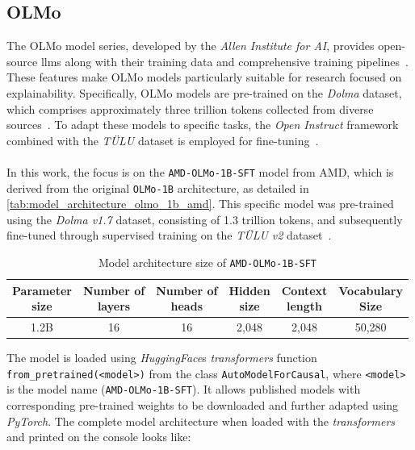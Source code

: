 \subsection{OLMo}
The OLMo model series, developed by the \emph{Allen Institute for AI}, provides open-source \acrshort{llm}s along with their training data and comprehensive training pipelines~\cite{DBLP:conf/acl/GroeneveldBWBKT24}. These features make OLMo models particularly suitable for research focused on explainability. Specifically, OLMo models are pre-trained on the \emph{Dolma} dataset, which comprises approximately three trillion tokens collected from diverse sources~\cite{DBLP:conf/acl/SoldainiKBSAABC24}. To adapt these models to specific tasks, the \emph{Open Instruct} framework combined with the \emph{TÜLU} dataset is employed for fine-tuning~\cite{DBLP:journals/corr/abs-2311-10702}.
\\\\
In this work, the focus is on the \texttt{AMD-OLMo-1B-SFT} model from AMD, which is derived from the original \texttt{OLMo-1B} architecture, as detailed in \autoref{tab:model_architecture_olmo_1b_amd}. This specific model was pre-trained using the \emph{Dolma v1.7} dataset, consisting of 1.3 trillion tokens, and subsequently fine-tuned through supervised training on the \emph{TÜLU v2} dataset~\cite{AMD-OLMo}.
\begin{table}[htb]
    \centering
    \begin{tabular}{|c|c|c|c|c|c|}
        \hline  
        \BreakHeader{Parameter \\ size} & \BreakHeader{Number of \\ layers} & \BreakHeader{Number of \\ heads} & \BreakHeader{Hidden \\ size} & \BreakHeader{Context \\ length} & \BreakHeader{Vocabulary \\ Size} \\ 
        \hline  
        1.2B & 16 & 16 & 2{,}048 & 2{,}048 & 50{,}280 \\
        \hline
    \end{tabular}
    \caption{Model architecture size of \texttt{AMD-OLMo-1B-SFT} \cite{AMD-OLMo}}
    \label{tab:model_architecture_olmo_1b_amd}
\end{table} 
The model is loaded using \emph{HuggingFace}\textquotesingle s \emph{transformers} function \texttt{from\_pretrained(\textless model\textgreater)} from the class \texttt{AutoModelForCausal}, where \texttt{<model>} is the model name (\texttt{AMD-OLMo-1B-SFT}). It allows published models with corresponding pre-trained weights to be downloaded and further adapted using \emph{PyTorch}. The complete model architecture when loaded with the \emph{transformers} and printed on the console looks like:
